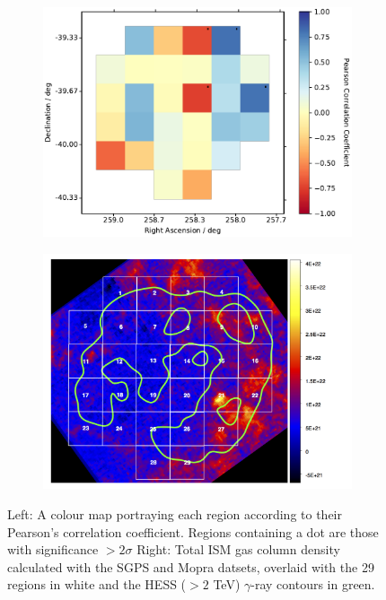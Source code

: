 \documentclass[12pt,a4paper]{article}
\begin{document}
\begin{figure}[H]
	\begin{subfigure}{0.5\textwidth}
		\centering
		\includegraphics[width=1.00\linewidth, height=0.25\textheight]{pearsonmap_gam_mopHI}
		\label{fig:corsigmap}
	\end{subfigure}
	\begin{subfigure}{0.5\textwidth}
		\centering
		\includegraphics[width=1.00\linewidth, height=0.25\textheight]{mopra_HI_hesscont}
		\label{fig:wpratiomap}
	\end{subfigure}
	\caption{Left: A colour map portraying each region according to their Pearson's correlation	coefficient. Regions containing a dot are those with significance $>2 \sigma$ Right: Total ISM gas column density calculated with the SGPS and Mopra datsets, overlaid with the 29 regions in white and the HESS ($>2$ TeV) $\gamma$-ray contours in green.}
	\label{fig:colourcoderegions}
\end{figure}
\end{document}
